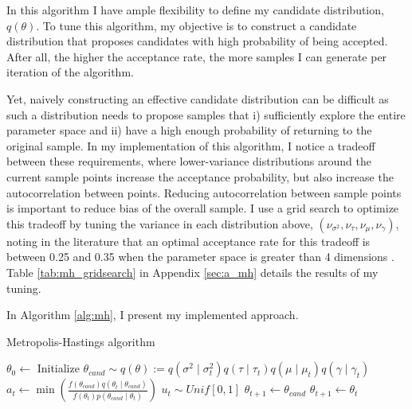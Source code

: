 \documentclass{article}
\begin{document}
In this algorithm I have ample flexibility to define my candidate distribution, $q(\theta)$. To tune this algorithm, my objective is to construct a candidate distribution that proposes candidates with high probability of being accepted. After all, the higher the acceptance rate, the more samples I can generate per iteration of the algorithm. 

Yet, naively constructing an effective candidate distribution can be difficult as such a distribution needs to propose samples that i) sufficiently explore the entire parameter space and ii) have a high enough probability of returning to the original sample. In my implementation of this algorithm, I notice a tradeoff between these requirements, where lower-variance distributions around the current sample points increase the acceptance probability, but also increase the autocorrelation between points. Reducing autocorrelation between sample points is important to reduce bias of the overall sample. I use a grid search to optimize this tradeoff by tuning the variance in each distribution above, $(\nu_{\sigma^2}, \nu_\tau, \nu_\mu, \nu_\gamma)$, noting in the literature that an optimal acceptance rate for this tradeoff is between 0.25 and 0.35 when the parameter space is greater than 4 dimensions \cite{Roberts}. Table \ref{tab:mh_gridsearch} in Appendix \ref{sec:a_mh} details the results of my tuning. 

In Algorithm \ref{alg:mh}, I present my implemented approach.

\begin{algorithm}[h]
  \caption{\label{alg:mh}Metropolis-Hastings algorithm}
    \begin{algorithmic}[1]
      \State $\theta_0 \longleftarrow$  Initialize
        \State $\theta_{cand} \sim q(\theta) := q(\sigma^2\mid\sigma^2_t)q(\tau\mid\tau_t)q(\mu\mid\mu_t)q(\gamma \mid \gamma_t)$
        \State $a_t \longleftarrow \min\left(\frac{f(\theta_{cand})q(\theta_t\mid\theta_{cand})}{f(\theta_t)p(\theta_{cand}\mid\theta_t)}\right)$
        \State $u_t \sim Unif[0,1]$
          \State $\theta_{t+1} \longleftarrow \theta_{cand}$
        \Else 
          \State $\theta_{t+1} \longleftarrow \theta_t$
        \EndIf
      \EndFor
    \end{algorithmic}
  \end{algorithm} 
\end{document}
